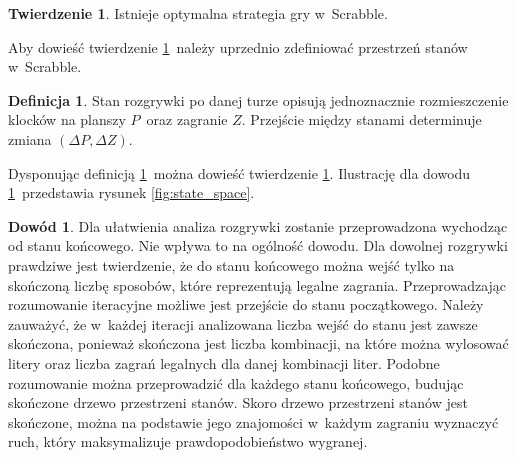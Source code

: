 \documentclass[a4paper,twocolumn,12pt]{article}
\theoremstyle{definition}
\newtheorem{theorem}{Twierdzenie}
\newtheorem{definition}{Definicja}
\newtheorem{pro}{Dowód}
\begin{document}
\begin{theorem}
	Istnieje optymalna strategia gry w~Scrabble.
	\label{thm:optimal_strategy_existence}
\end{theorem}

Aby dowieść twierdzenie \ref{thm:optimal_strategy_existence}~należy uprzednio zdefiniować przestrzeń stanów w~Scrabble.

\begin{definition}
	Stan rozgrywki po danej turze opisują jednoznacznie rozmieszczenie klocków na planszy $P$~oraz zagranie $Z$. Przejście między stanami determinuje zmiana $(\Delta P, \Delta Z)$.
	\label{def:scrabble_state_space}
\end{definition}

Dysponując definicją \ref{def:scrabble_state_space}~można dowieść twierdzenie \ref{thm:optimal_strategy_existence}. Ilustrację dla dowodu \ref{pro:optimal_strategy_existence}~przedstawia rysunek \ref{fig:state_space}.

\begin{pro}
	Dla ułatwienia analiza rozgrywki zostanie przeprowadzona wychodząc od stanu końcowego. Nie wpływa to na ogólność dowodu. Dla dowolnej rozgrywki prawdziwe jest twierdzenie, że do stanu końcowego można wejść tylko na skończoną liczbę sposobów, które reprezentują legalne zagrania. Przeprowadzając rozumowanie iteracyjne możliwe jest przejście do stanu początkowego. Należy zauważyć, że w~każdej iteracji analizowana liczba wejść do stanu jest zawsze skończona, ponieważ skończona jest liczba kombinacji, na które można wylosować litery oraz liczba zagrań legalnych dla danej kombinacji liter. Podobne rozumowanie można przeprowadzić dla każdego stanu końcowego, budując skończone drzewo przestrzeni stanów. Skoro drzewo przestrzeni stanów jest skończone, można na podstawie jego znajomości w~każdym zagraniu wyznaczyć ruch, który maksymalizuje prawdopodobieństwo wygranej.
	\label{pro:optimal_strategy_existence}
\end{pro}
\end{document}

